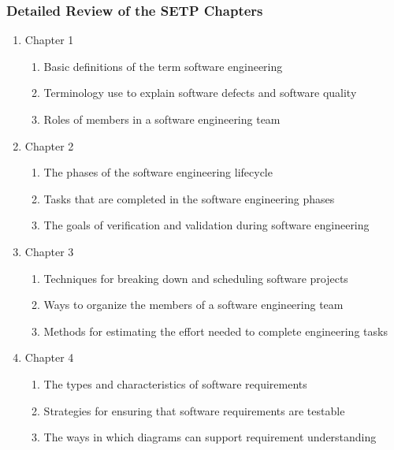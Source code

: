 \documentclass[11pt]{article}
\begin{document}

\subsubsection*{Detailed Review of the SETP Chapters}

\begin{enumerate}
  \itemsep 0in

  \item Chapter 1

    \begin{enumerate}
      \itemsep 0in
      \item Basic definitions of the term software engineering
      \item Terminology use to explain software defects and software quality
      \item Roles of members in a software engineering team
    \end{enumerate}

  \item Chapter 2

    \begin{enumerate}
      \itemsep 0in
      \item The phases of the software engineering lifecycle
      \item Tasks that are completed in the software engineering phases
      \item The goals of verification and validation during software engineering
    \end{enumerate}

  \item Chapter 3

    \begin{enumerate}
      \itemsep 0in
      \item Techniques for breaking down and scheduling software projects
      \item Ways to organize the members of a software engineering team
      \item Methods for estimating the effort needed to complete engineering
        tasks
    \end{enumerate}

  \item Chapter 4

    \begin{enumerate}
      \itemsep 0in
      \item The types and characteristics of software requirements
      \item Strategies for ensuring that software requirements are testable
      \item The ways in which diagrams can support requirement understanding
    \end{enumerate}


\end{enumerate}
\end{document}
